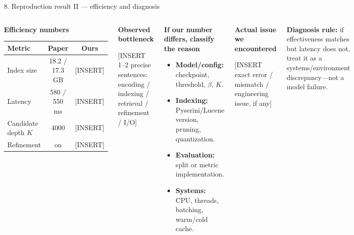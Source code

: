 \documentclass[aspectratio=169,9pt]{beamer}
\begin{document}
\begin{frame}[t]{8. Reproduction result II — efficiency and diagnosis}
\begin{columns}[T,totalwidth=\textwidth]
\begin{darkbox}
\scriptsize
\textbf{Efficiency numbers}\par\smallskip
\renewcommand{\arraystretch}{1.25}
\begin{tabularx}{\linewidth}{>{\raggedright\arraybackslash}Xcc}
\toprule
Metric & Paper & Ours \\
\midrule
Index size & 18.2 / 17.3 GB & \textcolor{amber}{[INSERT]} \\
Latency & 580 / 550 ms & \textcolor{amber}{[INSERT]} \\
Candidate depth $K$ & 4000 & \textcolor{amber}{[INSERT]} \\
Refinement & on & \textcolor{amber}{[INSERT]} \\
\bottomrule
\end{tabularx}
\end{darkbox}
\vspace{0.10cm}
\begin{cyanbox}
\scriptsize
\textbf{Observed bottleneck}\par
\textcolor{amber}{[INSERT 1–2 precise sentences: encoding / indexing / retrieval / refinement / I/O]}
\end{cyanbox}

\begin{violetbox}
\scriptsize
\textbf{If our number differs, classify the reason}
\begin{itemize}\scriptsize
\item \textbf{Model/config:} checkpoint, threshold, $\beta$, $K$.
\item \textbf{Indexing:} Pyserini/Lucene version, pruning, quantization.
\item \textbf{Evaluation:} split or metric implementation.
\item \textbf{Systems:} CPU, threads, batching, warm/cold cache.
\end{itemize}
\end{violetbox}
\vspace{0.10cm}
\begin{darkbox}
\scriptsize
\textbf{Actual issue we encountered}\par
\textcolor{amber}{[INSERT exact error / mismatch / engineering issue, if any]}
\end{darkbox}
\vspace{0.10cm}
\begin{darkbox}
\scriptsize
\textbf{Diagnosis rule:} if effectiveness matches but latency does not, treat it as a systems/environment discrepancy—not a model failure.
\end{darkbox}
\end{columns}
\end{frame}
\end{document}
